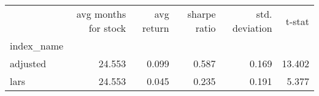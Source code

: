 \begin{tabular}{lrrrrr}
\toprule
{} &  avg months for stock &  avg return &  sharpe ratio &  std. deviation &  t-stat \\
index\_name &                       &             &               &                 &         \\
\midrule
adjusted   &                24.553 &       0.099 &         0.587 &           0.169 &  13.402 \\
lars       &                24.553 &       0.045 &         0.235 &           0.191 &   5.377 \\
\bottomrule
\end{tabular}
